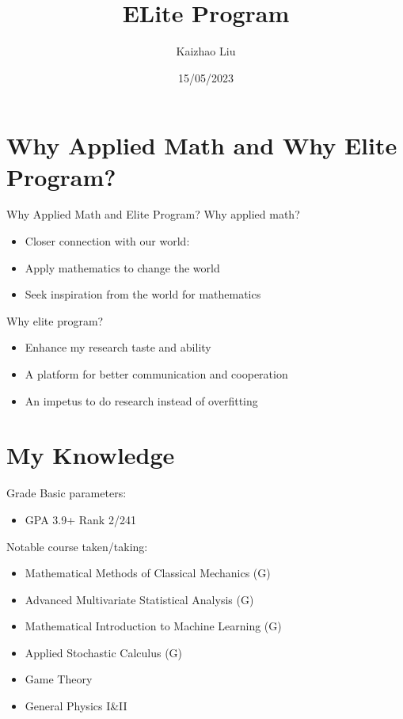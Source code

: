 \documentclass{beamer}
\title[Peking University]{ELite Program}
\author{Kaizhao Liu}
\institute{Peking University}
\date{15/05/2023}
\begin{document}
\begin{frame}
  \titlepage
\end{frame}


\section{Why Applied Math and Why Elite Program?}
\begin{frame}{Why Applied Math and Elite Program?}
  Why applied math?
  \begin{itemize}
    \item Closer connection with our world:
    \item Apply mathematics to change the world
    \item Seek inspiration from the world for mathematics
  \end{itemize}
  Why elite program?
  \begin{itemize}
    \item Enhance my research taste and ability
    \item A platform for better communication and cooperation
    \item An impetus to do research instead of overfitting
  \end{itemize}
\end{frame}


\section{My Knowledge}

\begin{frame}{Grade}
Basic parameters:
\begin{itemize}
  \item GPA 3.9+ Rank 2/241
\end{itemize}
Notable course taken/taking:
\begin{itemize}
   \item Mathematical Methods of Classical Mechanics (G) 
   \item Advanced Multivariate Statistical Analysis (G)
   \item Mathematical Introduction to Machine Learning (G)
   \item Applied Stochastic Calculus (G)
   \item Game Theory
   \item General Physics I\&II
\end{itemize}
\end{frame}
\end{document}
